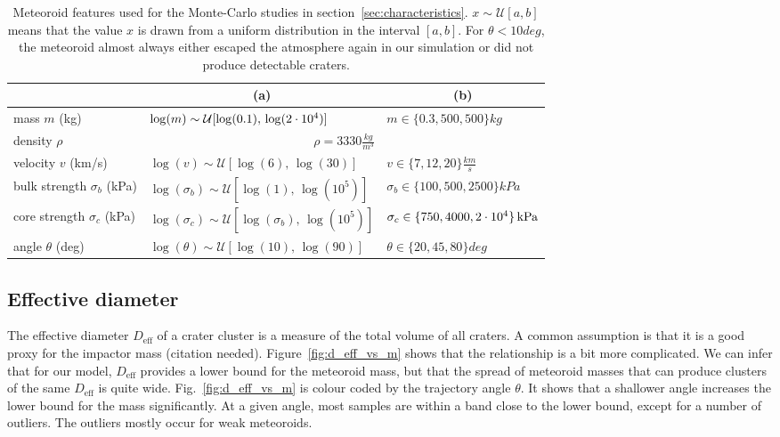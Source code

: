 \begin{table}
    \centering
    \begin{tabular}{l|l l}
        & \multicolumn{1}{c}{(a)} & \multicolumn{1}{c}{(b)} \\
        \hline
        mass $m$ (kg) & $\log(m) \sim \mathcal{U}[\log(0.1),\, \log(2\cdot 10^{4})]$ & $m \in \{0.3, 500, 500 \}\unit{kg}$ \\
        density $\rho$ & \multicolumn{2}{c}{$\rho = 3330 \unit{\frac{kg}{m^3}}$} \\
        velocity $v$ (km/s) & $\log(v) \sim \mathcal{U}[\log(6),\, \log(30)]$ & $v \in \{7, 12, 20\} \unit{\frac{km}{s}}$ \\
        bulk strength $\sigma_b$ (kPa) & $\log(\sigma_b) \sim \mathcal{U}[\log(1),\, \log(10^5)]$ & $\sigma_b \in \{100, 500, 2500\} \unit{kPa}$ \\
        core strength $\sigma_c$ (kPa) & $\log(\sigma_c) \sim \mathcal{U}[\log(\sigma_b),\, \log(10^5)]$ & $\sigma_c \in \{750, 4000, 2\cdot 10^{4}\} \,\mathrm{kPa}$ \\
        angle $\theta$ (deg) & $\log(\theta) \sim \mathcal{U}[\log(10),\, \log(90)]$ & $\theta \in \{20, 45, 80\}\unit{deg}$
    \end{tabular}
    \caption{Meteoroid features used for the Monte-Carlo studies in section~\ref{sec:characteristics}. $x\sim\mathcal{U}[a, b]$ means that the value $x$ is drawn from a uniform distribution in the interval $[a, b]$. For $\theta < 10\unit{deg}$, the meteoroid almost always either escaped the atmosphere again in our simulation or did not produce detectable craters.}
    \label{tab:mc_params}
\end{table}

\subsection{Effective diameter}
The effective diameter $D_\mathrm{eff}$ of a crater cluster is a measure of the total volume of all craters. A common assumption is that it is a good proxy for the impactor mass (citation needed).
Figure~\ref{fig:d_eff_vs_m} shows that the relationship is a bit more complicated. We can infer that for our model, $D_\mathrm{eff}$ provides a lower bound for the meteoroid mass, but that the spread of meteoroid masses that can produce clusters of the same $D_\mathrm{eff}$ is quite wide.
Fig.~\ref{fig:d_eff_vs_m} is colour coded by the trajectory angle $\theta$. It shows that a shallower angle increases the lower bound for the mass significantly.
At a given angle, most samples are within a band close to the lower bound, except for a number of outliers. The outliers mostly occur for weak meteoroids.

